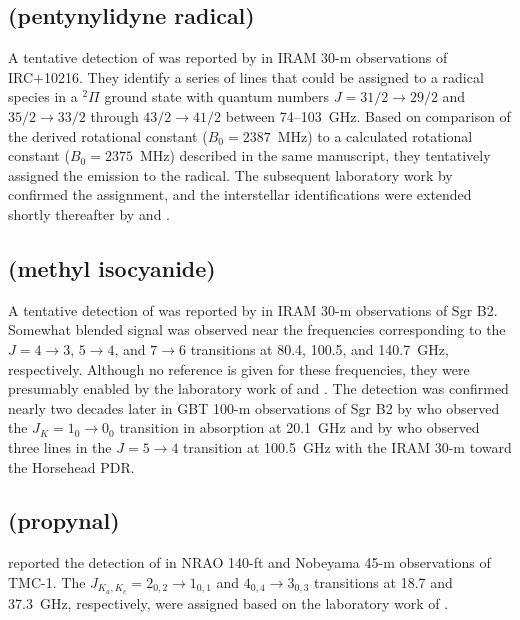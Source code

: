 \documentclass[twocolumn]{aastex631}
\begin{document}
	\subsection{ (pentynylidyne radical)}
	\label{C5H}
	
	A tentative detection of  was reported by \citet{Cernicharo:1986gh} in IRAM 30-m observations of IRC+10216.  They identify a series of lines that could be assigned to a radical species in a $^2\Pi$ ground state with quantum numbers $J = 31/2\rightarrow29/2$ and $35/2\rightarrow33/2$ through $43/2\rightarrow41/2$ between 74--103~GHz.  Based on comparison of the derived rotational constant ($B_0 = 2387$~MHz) to a calculated rotational constant ($B_0 = 2375$~MHz) described in the same manuscript, they tentatively assigned the emission to the  radical.  The subsequent laboratory work by \citet{Gottlieb:1986ew} confirmed the assignment, and the interstellar identifications were extended shortly thereafter by \citet{Cernicharo:1986ue} and \citet{Cernicharo:1987lw}.
	
	\subsection{ (methyl isocyanide)}
	\label{CH3NC}
	
	A tentative detection of  was reported by \citet{Cernicharo:1988kj} in IRAM 30-m observations of Sgr B2.  Somewhat blended signal was observed near the frequencies corresponding to the $J = 4\rightarrow3$, $5\rightarrow4$, and $7\rightarrow6$ transitions at 80.4, 100.5, and 140.7~GHz, respectively.  Although no reference is given for these frequencies, they were presumably enabled by the laboratory work of \citet{Kukolich:1972iq} and \citet{Ring:1947bn}.  The detection was confirmed nearly two decades later in GBT 100-m observations of Sgr B2 by \citet{Remijan:2005kd} who observed the $J_K = 1_0\rightarrow0_0$ transition in absorption at 20.1~GHz and by \citet{Gratier:2013gm} who observed three lines in the $J = 5\rightarrow4$ transition at 100.5~GHz with the IRAM 30-m toward the Horsehead PDR.
	
	\subsection{ (propynal)}
	\label{HC2CHO}
	
	\citet{Irvine:1988dw} reported the detection of  in NRAO 140-ft and Nobeyama 45-m observations of TMC-1.  The $J_{K_a,K_c} = 2_{0,2}\rightarrow1_{0,1}$ and $4_{0,4}\rightarrow3_{0,3}$ transitions at 18.7 and 37.3~GHz, respectively, were assigned based on the laboratory work of \citet{Winnewisser:1973gc}.
	
\end{document}
